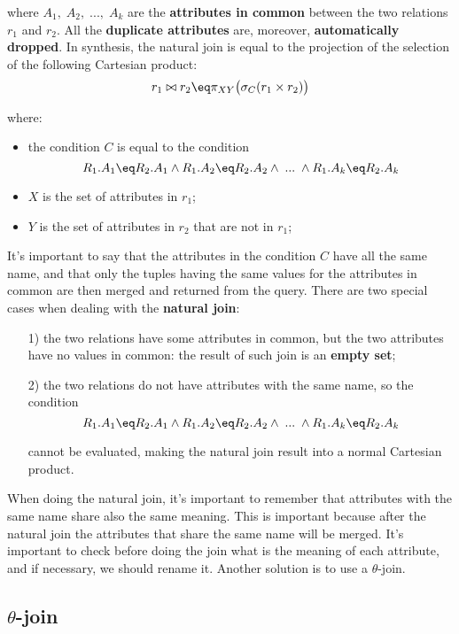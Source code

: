 where $A_1, \; A_2, \; ..., \; A_k$ are the \textbf{attributes in common} between the two relations $r_1$ and $r_2$. All the \textbf{duplicate attributes} are, moreover, \textbf{automatically dropped}. In synthesis, the natural join is equal to the projection of the selection of the following Cartesian product:
\[ r_1 \bowtie r_2 \eq \pi_{XY}\big( \sigma_C(r_1 \times r_2) \big) \]

where:
\begin{itemize}
    \item the condition $C$ is equal to the condition
    \[ R_1.A_1 \eq R_2.A_1 \wedge R_1.A_2 \eq R_2.A_2 \wedge \; ... \; \wedge R_1.A_k \eq R_2.A_k \]
    \item $X$ is the set of attributes in $r_1$;
    \item $Y$ is the set of attributes in $r_2$ that are not in $r_1$;
\end{itemize}

It's important to say that the attributes in the condition $C$ have all the same name, and that only the tuples having the same values for the attributes in common are then merged and returned from the query.
\nwl
There are two special cases when dealing with the \textbf{natural join}:
\begin{itemize}
    \item [1)] the two relations have some attributes in common, but the two attributes have no values in common: the result of such join is an \textbf{empty set};
    \item [2)] the two relations do not have attributes with the same name, so the condition
    \[ R_1.A_1 \eq R_2.A_1 \wedge R_1.A_2 \eq R_2.A_2 \wedge \; ... \; \wedge R_1.A_k \eq R_2.A_k \]

    cannot be evaluated, making the natural join result into a normal Cartesian product.
\end{itemize}

When doing the natural join, it's important to remember that attributes with the same name share also the same meaning. This is important because after the natural join the attributes that share the same name will be merged. It's important to check before doing the join what is the meaning of each attribute, and if necessary, we should rename it. Another solution is to use a $\theta$-join.

\subsection{\texorpdfstring{$\theta$}{Theta}-join}

